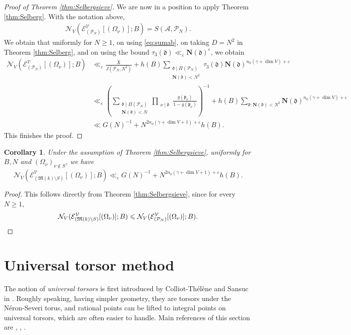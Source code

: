 \documentclass[11pt,letterpaper]{amsart}
\newcommand{\CA}{{\mathcal {A}}}
\newcommand{\CE}{{\mathcal {E}}}
\newcommand{\CN}{{\mathcal {N}}}
\newcommand{\CP}{{\mathcal {P}}}
\newcommand{\CV}{{\mathcal {V}}}
\theoremstyle{plain}
\numberwithin{equation}{section}
\newtheorem{corollary}[theorem]{Corollary}
\theoremstyle{definition}
\theoremstyle{remark}
\begin{document}
\begin{proof}[Proof of Theorem \ref{thm:Selbergsieve}]
	We are now in a position to apply Theorem \ref{thm:Selberg}.
	With the notation above, \begin{align*}
		\CN_V(\CE^{\CV}_{(\CP_N)}[(\Omega_\nu)];B)= S(\CA,\CP_N).
	\end{align*}
	We obtain that uniformly for $N\geqslant 1$, on using \eqref{eq:sumab}, on taking $D=N^2$ in Theorem \ref{thm:Selberg}, and on using the bound $\tau_3(\mathfrak{d})\ll_\varepsilon \mathbf{N}(\mathfrak{d})^\varepsilon$, we obtain
	\begin{align*}
		\CN_V(\CE^{\CV}_{(\CP_N)}[(\Omega_\nu)];B)&\ll_\varepsilon \frac{\mathfrak{X}}{J(\CP_N,N^2)}+h(B)\sum_{\substack{\mathfrak{d}\mid\Pi(\CP_N)\\\mathbf{N}(\mathfrak{d})<N^2}}\tau_3(\mathfrak{d})\mathbf{N}(\mathfrak{d})^{n_0(\gamma+\dim V)+\varepsilon}\\ &\ll_\varepsilon \left(\sum_{\substack{\mathfrak{d}\mid \Pi(\CP_N)\\ \mathbf{N}(\mathfrak{d})<N}}\prod_{\substack{\nu\mid \mathfrak{d}}}\frac{g(\mathfrak{p}_\nu)}{1-g(\mathfrak{p}_\nu)}\right)^{-1}+h(B)\sum_{\mathfrak{d}:\mathbf{N}(\mathfrak{d})<N^2}\mathbf{N}(\mathfrak{d})^{n_0(\gamma+\dim V)+\varepsilon}\\ &\ll G(N)^{-1}+N^{2n_0(\gamma+\dim V+1)+\varepsilon} h(B).
	\end{align*}
	This finishes the proof.
\end{proof}
\begin{corollary}\label{cor:Selberg}
	Under the assumption of Theorem \ref{thm:Selbergsieve}, 
	uniformly  for $B, N$ and $(\Omega_\nu)_{\nu\notin S}$, we have
	$$\CN_V(\CE^{\CV}_{(\mathfrak{M}(k)\setminus S)}[(\Omega_\nu)];B)\ll_\varepsilon G(N)^{-1}+N^{2n_0(\gamma+\dim V+1)+\varepsilon} h(B).$$
\end{corollary}
\begin{proof}
	This follows directly from Theorem \ref{thm:Selbergsieve}, since for every $N\geqslant 1$, \begin{equation*}
		\CN_V(\CE^{\CV}_{(\mathfrak{M}(k)\setminus S)}[(\Omega_\nu)];B)\leqslant \CN_V(\CE^{\CV}_{(\CP_N)}[(\Omega_\nu)];B).\qedhere
	\end{equation*}
\end{proof}

\section{Universal torsor method}\label{se:univtor}
The notion of \emph{universal torsors} is first introduced by Colliot-Thélène and Sansuc in \cite{CT-Sansuc}. Roughly speaking, having simpler geometry, they are torsors under the Néron-Severi torus, and rational points can be lifted to integral points on universal torsors, which are often easier to handle. Main references of this section are \cite[\S5]{Salberger}, \cite[\S4]{Peyre2}, \cite[\S4.3]{PeyreBeyond}.
\end{document}
